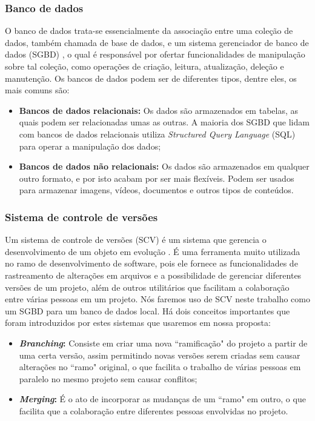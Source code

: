 \subsubsection{Banco de dados}
O banco de dados trata-se essencialmente da associação entre uma coleção de dados, também chamada de base de dados, e um sistema gerenciador de banco de dados (SGBD) \cite{database}, o qual é responsável por ofertar funcionalidades de manipulação sobre tal coleção, como operações de criação, leitura, atualização, deleção e manutenção. Os bancos de dados podem ser de diferentes tipos, dentre eles, os mais comuns são:
\begin{itemize}
    \item \textbf{Bancos de dados relacionais:} Os dados são armazenados em tabelas, as quais podem ser relacionadas umas as outras. A maioria dos SGBD que lidam com bancos de dados relacionais utiliza \textit{Structured Query Language} (SQL) para operar a manipulação dos dados;
    \item \textbf{Bancos de dados não relacionais:} Os dados são armazenados em qualquer outro formato, e por isto acabam por ser mais flexíveis. Podem ser usados para armazenar imagens, vídeos, documentos e outros tipos de conteúdos.
\end{itemize}

\subsubsection{Sistema de controle de versões}
Um sistema de controle de versões (SCV) é um sistema que gerencia o desenvolvimento de um objeto em evolução \cite{scv}. É uma ferramenta muito utilizada no ramo de desenvolvimento de software, pois ele fornece as funcionalidades de rastreamento de alterações em arquivos e a possibilidade de gerenciar diferentes versões de um projeto, além de outros utilitários que facilitam a colaboração entre várias pessoas em um projeto. Nós faremos uso de SCV neste trabalho como um SGBD para um banco de dados local. Há dois conceitos importantes que foram introduzidos por estes sistemas que usaremos em nossa proposta:
\begin{itemize}
    \item \textbf{\textit{Branching}:} Consiste em criar uma nova “ramificação" do projeto a partir de uma certa versão, assim permitindo novas versões serem criadas sem causar alterações no “ramo" original, o que facilita o trabalho de várias pessoas em paralelo no mesmo projeto sem causar conflitos;
    \item \textbf{\textit{Merging}:} É o ato de incorporar as mudanças de um “ramo" em outro, o que facilita que a colaboração entre diferentes pessoas envolvidas no projeto.
\end{itemize}

